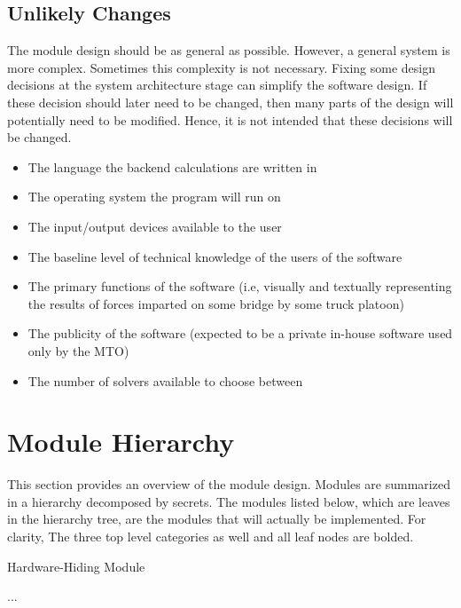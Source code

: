 \documentclass[12pt, titlepage]{article}
\newcounter{mnum}
\newcommand{\mthemnum}{M\themnum}
\begin{document}
\subsection{Unlikely Changes} \label{SecUchange}

The module design should be as general as possible. However, a general system is
more complex. Sometimes this complexity is not necessary. Fixing some design
decisions at the system architecture stage can simplify the software design. If
these decision should later need to be changed, then many parts of the design
will potentially need to be modified. Hence, it is not intended that these
decisions will be changed.

\begin{itemize}
    \item The language the backend calculations are written in
    \item The operating system the program will run on
    \item The input/output devices available to the user
    \item The baseline level of technical knowledge of the users of the software
    \item The primary functions of the software (i.e, visually and textually representing the results of forces imparted on some bridge by some truck platoon)
    \item The publicity of the software (expected to be a private in-house software used only by the MTO)
    \item The number of solvers available to choose between
\end{itemize}

\section{Module Hierarchy} \label{SecMH}

This section provides an overview of the module design. Modules are summarized
in a hierarchy decomposed by secrets. The modules listed
below, which are leaves in the hierarchy tree, are the modules that will
actually be implemented. For clarity, The three top level categories as well and all leaf nodes are bolded.

\begin{description}
\item [ \mthemnum \label{mHH}:] Hardware-Hiding Module
\item ...
\end{description}
\end{document}
